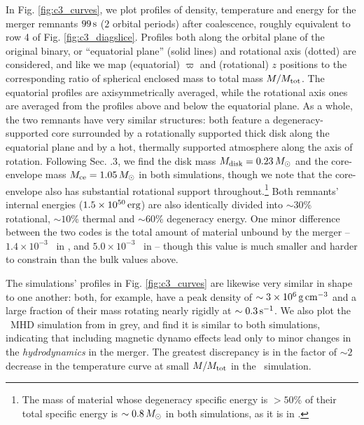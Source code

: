 In Fig. \ref{fig:c3_curves}, we plot profiles of density, temperature and energy for the merger remnants $99\,\mathrm{s}$ ($2$ orbital periods) after coalescence, roughly equivalent to row 4 of Fig. \ref{fig:c3_diagslice}.  Profiles both along the orbital plane of the original binary, or ``equatorial plane'' (solid lines) and rotational axis (dotted) are considered, and like \citeal{zhu+13} we map (equatorial) $\varpi$ and (rotational) $z$ positions to the corresponding ratio of spherical enclosed mass to total mass $M/M_{\rm tot}$.  The equatorial profiles are axisymmetrically averaged, while the rotational axis ones are averaged from the profiles above and below the equatorial plane.  As a whole, the two remnants have very similar structures: both feature a degeneracy-supported core surrounded by a rotationally supported thick disk along the equatorial plane and by a hot, thermally supported atmosphere along the axis of rotation.  Following \citeal{zhu+13} Sec. {.3}, we find the disk mass $\Mdisk = 0.23\,\Msun$ and the core-envelope mass $\Mrem = 1.05\,\Msun$ in both simulations, though we note that the core-envelope also has substantial rotational support throughout.\footnote{The mass of material whose degeneracy specific energy is $>50$\% of their total specific energy is $\sim0.8\,\Msun$ in both simulations, as it is in \cite{zhu+15}.}  Both remnants' internal energies ($1.5\times10^{50}\,\mathrm{erg}$) are also identically divided into $\sim30$\% rotational, $\sim10$\% thermal and $\sim60$\% degeneracy energy.  One minor difference between the two codes is the total amount of material unbound by the merger -- $1.4\times10^{-3}$ \Msun\ in \gasoline, and $5.0\times10^{-3}$ \Msun\ in \arepo -- though this value is much smaller and harder to constrain than the bulk values above.



The simulations' profiles in Fig. \ref{fig:c3_curves} are likewise very similar in shape to one another: both, for example, have a peak density of $\sim3\times10^6\,\gcc$ and a large fraction of their mass rotating nearly rigidly at $\sim0.3\,\psec$.  We also plot the \arepo\ MHD simulation from \cite{zhu+15} in grey, and find it is similar to both simulations, indicating that including magnetic dynamo effects lead only to minor changes in the \textit{hydrodynamics} in the merger.  The greatest discrepancy is in the factor of $\sim2$ decrease in the temperature curve at small $M/M_{\rm tot}$ in the \arepo\ simulation.  

